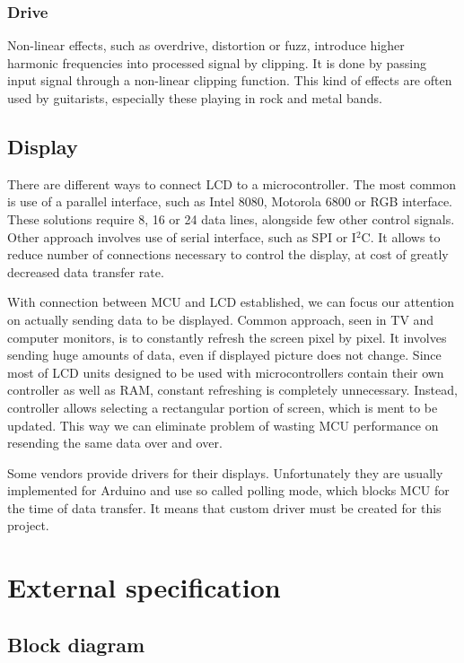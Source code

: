 \documentclass[a4paper,twoside,12pt]{book}
\begin{document}
\subsection{Drive}
Non-linear effects, such as overdrive, distortion or fuzz,
introduce higher harmonic frequencies into processed signal by clipping.
It is done by passing input signal through a non-linear clipping function.
This kind of effects are often used by guitarists,
especially these playing in rock and metal bands.

\section{Display}
There are different ways to connect LCD to a microcontroller.
The most common is use of a parallel interface,
such as Intel 8080, Motorola 6800 or RGB interface.
These solutions require 8, 16 or 24 data lines,
alongside few other control signals.
Other approach involves use of serial interface,
such as SPI or I\(^2\)C.
It allows to reduce number of connections necessary to control the display,
at cost of greatly decreased data transfer rate.

With connection between MCU and LCD established,
we can focus our attention on actually sending data to be displayed.
Common approach, seen in TV and computer monitors,
is to constantly refresh the screen pixel by pixel.
It involves sending huge amounts of data,
even if displayed picture does not change.
Since most of LCD units designed to be used with microcontrollers
contain their own controller as well as RAM,
constant refreshing is completely unnecessary.
Instead, controller allows selecting a rectangular portion
of screen, which is ment to be updated.
This way we can eliminate problem of wasting MCU performance
on resending the same data over and over.

Some vendors provide drivers for their displays.
Unfortunately they are usually implemented for Arduino
and use so called polling mode,
which blocks MCU for the time of data transfer.
It means that custom driver must be created for this project.


\chapter{External specification}

\section{Block diagram}
\end{document}
